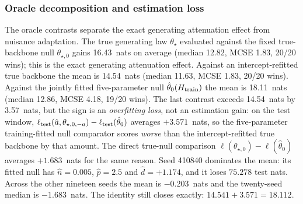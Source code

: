 \subsubsection{Oracle decomposition and estimation loss}\label{sec:s8-oracle}
The oracle contrasts separate the exact generating attenuation effect from nuisance adaptation. The true generating law $\theta_\star$ evaluated against the fixed true-backbone null $\theta_{\star,0}$ gains 16.43~nats on average (median 12.82, MCSE 1.83, 20/20 wins); this is the exact generating attenuation effect. Against an intercept-refitted true backbone the mean is 14.54~nats (median 11.63, MCSE 1.83, 20/20 wins). Against the jointly fitted five-parameter null $\hat\theta_0(H_{\rm train})$ the mean is 18.11~nats (median 12.86, MCSE 4.18, 19/20 wins). The last contrast exceeds 14.54~nats by 3.57~nats, but the sign is an \emph{overfitting loss}, not an estimation gain: on the test window, $\ell_{\rm test}(\hat a,\theta_{\star,0,-a})-\ell_{\rm test}(\hat\theta_0)$ averages $+3.571$~nats, so the five-parameter training-fitted null comparator scores \emph{worse} than the intercept-refitted true backbone by that amount. The direct true-null comparison $\ell(\theta_{\star,0})-\ell(\hat\theta_0)$ averages $+1.683$~nats for the same reason. Seed 410840 dominates the mean: its fitted null has $\hat n=0.005$, $\hat p=2.5$ and $\hat d=+1.174$, and it loses $75.278$ test nats. Across the other nineteen seeds the mean is $-0.203$~nats and the twenty-seed median is $-1.683$~nats. The identity still closes exactly: $14.541+3.571=18.112$.


